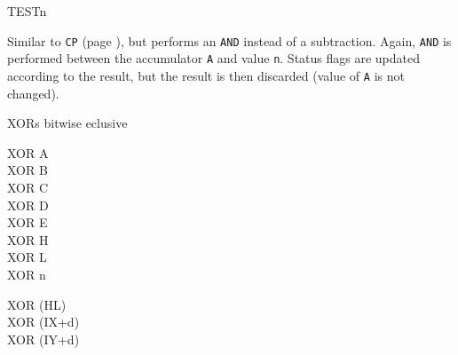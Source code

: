\begin{basedescript}{
	\desclabelstyle{\multilinelabel}
	\desclabelwidth{3cm}}
	\begin{DetailItem}{TEST}{n\ZXN}
		{}
		{\SymTEST}

		Similar to {\tt CP} (page ), but performs an {\tt AND} instead of a subtraction. Again, {\tt AND} is performed between the accumulator {\tt A} and value {\tt n}. Status flags are updated according to the result, but the result is then discarded (value of {\tt A} is not changed).

		\begin{DetailEffects}[p]
			\FlagsTESTn
		\end{DetailEffects}

		\begin{DetailEffectsFlags}
			\DetailFlagSF{\DetailFlagResultSign}
			\DetailFlagPV{\DetailFlagResultParity}
		\end{DetailEffectsFlags}

		\begin{DetailTiming}
		\end{DetailTiming}

	\end{DetailItem}


	\pagebreak
	\begin{DetailItem}{XOR}{s}
		{bitwise eclusive }
		{}

		\begin{DetailVariants}
			XOR A\\
			XOR B\\
			XOR C\\
			XOR D\\
			XOR E\\
			XOR H\\
			XOR L\\
			XOR n

			\columnbreak
			XOR (HL)\\
			XOR (IX+d)\\
			XOR (IY+d)


\end{DetailVariants}
\end{DetailItem}
\end{basedescript}
